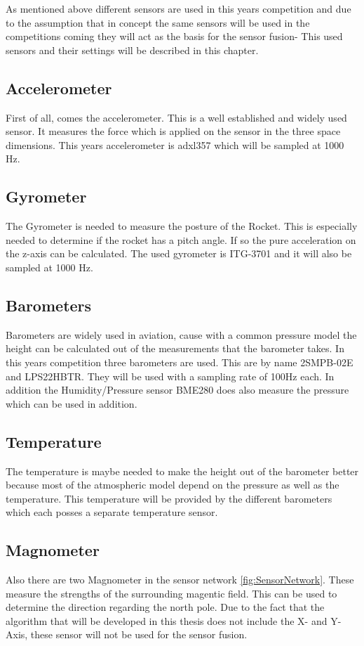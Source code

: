  As mentioned above different sensors are used in this years competition and due to the assumption
 that in concept the same sensors will be used in the competitions coming they will act as the basis for the sensor fusion-
 This used sensors and their settings will be described in this chapter.

 \subsection{Accelerometer}
 First of all, comes the accelerometer. This is a well established and widely used sensor. It measures the force which is applied on the sensor in the three
 space dimensions. 
 This years accelerometer is adxl357 which will be sampled at 1000 Hz. 
 
 \subsection{Gyrometer}
 The Gyrometer is needed to measure the posture of the Rocket. This is especially needed to determine if the rocket has a pitch angle. If so the pure
 acceleration on the z-axis can be calculated. The used gyrometer is ITG-3701 and it will also be sampled at 1000 Hz.
 
 \subsection{Barometers}
 Barometers are widely used in aviation, cause with a common pressure model the height can be calculated out of the measurements that the barometer takes.
 In this years competition three barometers are used. This are by name 2SMPB-02E and LPS22HBTR. They will be used with a sampling rate of 100Hz each.
 In addition the Humidity/Pressure sensor BME280 does also measure the pressure which can be used in addition.
 
 \subsection{Temperature}
 The temperature is maybe needed to make the height out of the barometer better because most of the atmospheric model depend on the pressure as well as the temperature.
 This temperature will be provided by the different barometers which each posses a separate temperature sensor. 
 
 \subsection{Magnometer}
 Also there are two Magnometer in the sensor network \ref{fig:SensorNetwork}. These measure the strengths of the surrounding magentic field.
 This can be used to determine the direction regarding the north pole.
 Due to the fact that the algorithm that will be developed in this thesis does not include the X- and Y-Axis,
 these sensor will not be used for the sensor fusion.
 
